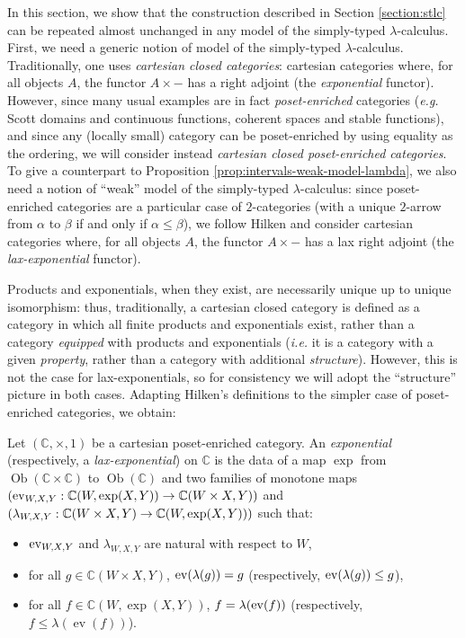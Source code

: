 In this section, we show that the construction described in Section \ref{section:stlc} can be repeated almost unchanged in any model of the simply-typed $\lambda$-calculus. First, we need a generic notion of model of the simply-typed $\lambda$-calculus. Traditionally, one uses \emph{cartesian closed categories}: cartesian categories where, for all objects $A$, the functor $A \times -$ has a right adjoint (the \emph{exponential} functor). However, since many usual examples are in fact \emph{poset-enriched} categories (\textit{e.g.} Scott domains and continuous functions, coherent spaces and stable functions), and since any (locally small) category can be poset-enriched by using equality as the ordering, we will consider instead \emph{cartesian closed poset-enriched categories}. To give a counterpart to Proposition \ref{prop:intervals-weak-model-lambda}, we also need a notion of ``weak'' model of the simply-typed $\lambda$-calculus: since poset-enriched categories are a particular case of $2$-categories (with a unique $2$-arrow from $\alpha$ to $\beta$ if and only if $\alpha \leq \beta$), we follow Hilken \cite{hilken:2-lambda} and consider cartesian categories where, for all objects $A$, the functor $A \times -$ has a lax right adjoint (the \emph{lax-exponential} functor).

Products and exponentials, when they exist, are necessarily unique up to unique isomorphism: thus, traditionally, a cartesian closed category is defined as a category in which all finite products and exponentials exist, rather than a category \emph{equipped} with products and exponentials (\textit{i.e.} it is a category with a given \emph{property}, rather than a category with additional \emph{structure}). However, this is not the case for lax-exponentials, so for consistency we will adopt the ``structure'' picture in both cases. Adapting Hilken's definitions \cite{hilken:2-lambda} to the simpler case of poset-enriched categories, we obtain:

\begin{definition} Let $(\mathbb{C}, \times, 1)$ be a cartesian poset-enriched category. An \emph{exponential} (respectively, a \emph{lax-exponential}) on $\mathbb{C}$ is the data of a map $\exp$ from $\operatorname{Ob}(\mathbb{C} \times \mathbb{C})$ to $\operatorname{Ob}(\mathbb{C})$ and two families of monotone maps $(\operatorname{ev}_{W,X,Y} : \mathbb{C}(W, \operatorname{exp}(X,Y)) \to \mathbb{C}(W \times X, Y))$ and $(\lambda_{W,X,Y} : \mathbb{C}(W \times X, Y) \to \mathbb{C}(W, \exp(X,Y)))$ such that: \begin{itemize}
\item $\operatorname{ev}_{W,X,Y}$ and $\lambda_{W,X,Y}$ are natural with respect to $W$,
\item for all $g \in \mathbb{C}(W \times X, Y)$, $\operatorname{ev}(\lambda(g)) = g$ (respectively, $\operatorname{ev}(\lambda(g)) \leq g$),
\item for all $f \in \mathbb{C}(W, \exp(X,Y))$, $f = \lambda(\operatorname{ev}(f))$ (respectively, $f \leq \lambda(\operatorname{ev}(f))$).
\end{itemize}
\end{definition}


